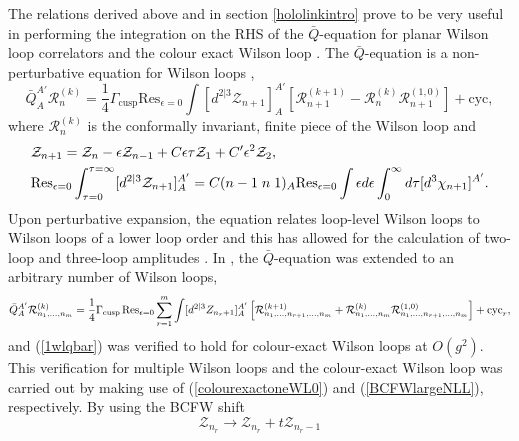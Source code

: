 \documentclass[12pt]{article}
\numberwithin{equation}{section}
\begin{document}
The relations derived above and in section \ref{hololinkintro} prove to be very useful in performing the integration on the RHS of the $\bar{Q}$-equation for planar Wilson loop correlators and the colour exact Wilson loop \cite{Drummond:2026lvq}. The $\bar{Q}$-equation is a non-perturbative equation for Wilson loops \cite{Caron-Huot:2011dec},
\begin{equation}
    \bar{Q}^{A'}_{A}\mathcal{R}_n^{(k)}=\frac{1}{4} \Gamma_{\textrm{cusp}} \textrm{Res}_{\epsilon=0}\int [d^{2|3}\mathcal{Z}_{n+1}]^{A'}_{A}[\mathcal{R}_{n+1}^{(k+1)}-\mathcal{R}_{n}^{(k)}\mathcal{R}_{n+1}^{(1,0)}]+\textrm{cyc},
\end{equation}
where $\mathcal{R}_n^{(k)}$ is the conformally invariant, finite piece of the Wilson loop and 
\begin{align}
    &\mathcal{Z}_{n+1}=\mathcal{Z}_{n}-\epsilon \mathcal{Z}_{n-1}+C \epsilon \tau \mathcal{Z}_1 + C' \epsilon^2 \mathcal{Z}_2,\\
    &\textrm{Res}_{\epsilon=0} \int_{\tau=0}^{\tau=\infty}[d^{2|3}\mathcal{Z}_{n+1}]_{A}^{A'}=C (n-1 \hspace{1mm} n \hspace{1mm} 1)_A \textrm{Res}_{\epsilon=0}\int \epsilon d \epsilon \int_0^\infty d \tau [d^3 \chi_{n+1}]^{A'}.
    \label{1wlqbar}
\end{align}
Upon perturbative expansion, the equation relates loop-level Wilson loops to Wilson loops of a lower loop order and this has allowed for the calculation of two-loop and three-loop amplitudes \cite{He:2020vob, Li:2021bwg}. In \cite{Drummond:2025ulh}, the $\bar{Q}$-equation was extended to an arbitrary number of Wilson loops,
\begin{equation}
    \bar{Q}_A^{A'} \mathcal{R}_{n_1,\hdots,n_m}^{(k)}=\frac{1}{4} \Gamma_{\textrm{cusp}}\hspace{0.5mm} \textrm{Res}_{\epsilon=0}\sum_{r=1}^{m}\int [d^{2|3}Z_{n_r+1}]^{A'}_A \left[\mathcal{R}_{n_1,\hdots,n_{r+1},\hdots,n_m}^{(k+1)}+\mathcal{R}_{n_1,\hdots,n_m}^{(k)}\mathcal{R}_{n_1,\hdots,n_{r+1},\hdots,n_m}^{(1,0)}\right] + \textrm{cyc}_r,
\end{equation}
and (\ref{1wlqbar}) was verified to hold for colour-exact Wilson loops at $O(g^2)$. This verification for multiple Wilson loops and the colour-exact Wilson loop was carried out by making use of (\ref{colourexactoneWL0}) and (\ref{BCFWlargeNLL}), respectively. By using the BCFW shift\begin{equation}
    \mathcal{Z}_{n_r}\rightarrow \mathcal{Z}_{n_r}+t \mathcal{Z}_{n_r-1}
\end{equation}
\end{document}
